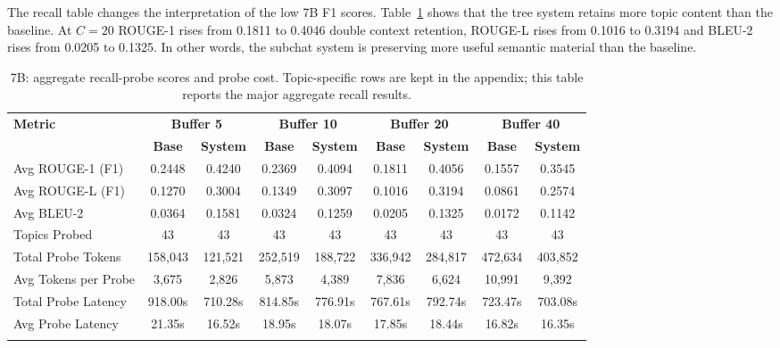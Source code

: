 The recall table changes the interpretation of the low 7B F1 scores. Table~\ref{tab:7b_recall_main} shows that the tree system retains more topic content than the baseline. At $C=20$ ROUGE-1 rises from 0.1811 to 0.4046 double context retention, ROUGE-L rises from 0.1016 to 0.3194 and BLEU-2 rises from 0.0205 to 0.1325. In other words, the subchat system is preserving more useful semantic material than the baseline.





\begin{table}[htbp]
\caption{7B: aggregate recall-probe scores and probe cost. Topic-specific rows are kept in the appendix; this table reports the major aggregate recall results.}\label{tab:7b_recall_main}
\centering
\scriptsize
\setlength{\tabcolsep}{3pt}
\begin{adjustbox}{width=\textwidth}
\begin{tabular}{lcccccccc}
\toprule
\textbf{Metric} & \multicolumn{2}{c}{\textbf{Buffer 5}} & \multicolumn{2}{c}{\textbf{Buffer 10}} & \multicolumn{2}{c}{\textbf{Buffer 20}} & \multicolumn{2}{c}{\textbf{Buffer 40}} \\
\cmidrule(lr){2-3}\cmidrule(lr){4-5}\cmidrule(lr){6-7}\cmidrule(lr){8-9}
 & \textbf{Base} & \textbf{System} & \textbf{Base} & \textbf{System} & \textbf{Base} & \textbf{System} & \textbf{Base} & \textbf{System} \\
\midrule
Avg ROUGE-1 (F1) & 0.2448 & 0.4240 & 0.2369 & 0.4094 & 0.1811 & 0.4056 & 0.1557 & 0.3545 \\
Avg ROUGE-L (F1) & 0.1270 & 0.3004 & 0.1349 & 0.3097 & 0.1016 & 0.3194 & 0.0861 & 0.2574 \\
Avg BLEU-2 & 0.0364 & 0.1581 & 0.0324 & 0.1259 & 0.0205 & 0.1325 & 0.0172 & 0.1142 \\
Topics Probed & 43 & 43 & 43 & 43 & 43 & 43 & 43 & 43 \\
Total Probe Tokens & 158,043 & 121,521 & 252,519 & 188,722 & 336,942 & 284,817 & 472,634 & 403,852 \\
Avg Tokens per Probe & 3,675 & 2,826 & 5,873 & 4,389 & 7,836 & 6,624 & 10,991 & 9,392 \\
Total Probe Latency & 918.00s & 710.28s & 814.85s & 776.91s & 767.61s & 792.74s & 723.47s & 703.08s \\
Avg Probe Latency & 21.35s & 16.52s & 18.95s & 18.07s & 17.85s & 18.44s & 16.82s & 16.35s \\
\botrule
\end{tabular}
\end{adjustbox}
\end{table}

